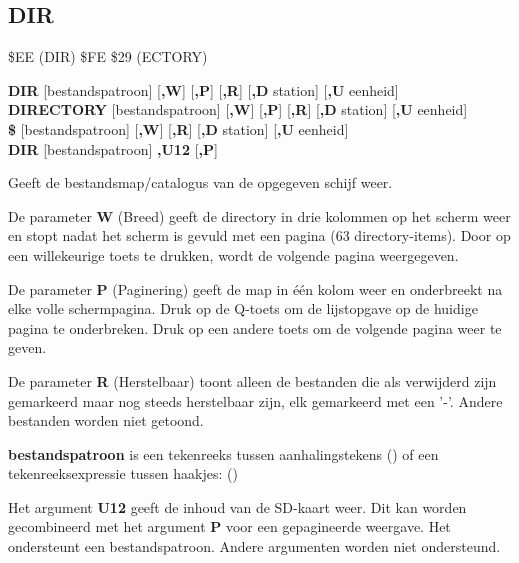 
\newpage
\subsection{DIR}
\begin{description}[leftmargin=2cm,style=nextline]
\item [Token:]    \$EE (DIR) \$FE \$29 (ECTORY)

\item [Formaat:]   {\bf DIR} [bestandspatroon] [{\bf,W}] [{\bf,P}] [{\bf,R}] [{\bf,D} station] [{\bf,U} eenheid] \\		            {\bf DIRECTORY} [bestandspatroon] [{\bf,W}] [{\bf,P}] [{\bf,R}] [{\bf,D} station] [{\bf,U} eenheid] \\		            {\bf \$} [bestandspatroon] [{\bf,W}] [{\bf,R}] [{\bf,D} station] [{\bf,U} eenheid] \\                  {\bf DIR} [bestandspatroon] {\bf,U12} [{\bf,P}]

\item [Gebruik:]    Geeft de bestandsmap/catalogus van de opgegeven schijf weer.

                  De parameter {\bf W} (Breed) geeft de directory in drie kolommen op het scherm weer en stopt nadat het scherm is gevuld met een pagina (63 directory-items). Door op een willekeurige toets te drukken, wordt de volgende pagina weergegeven.

De parameter {\bf P} (Paginering) geeft de map in één kolom weer en onderbreekt na elke volle schermpagina. Druk op de Q-toets om de lijstopgave op de huidige pagina te onderbreken. Druk op een andere toets om de volgende pagina weer te geven.

                  De parameter {\bf R} (Herstelbaar) toont alleen de bestanden die als verwijderd zijn gemarkeerd maar nog steeds herstelbaar zijn, elk gemarkeerd met een '-'. Andere bestanden worden niet getoond.

                  {\bf bestandspatroon} is een tekenreeks tussen aanhalingstekens () of een tekenreeksexpressie tussen haakjes: ()

                  Het argument {\bf U12} geeft de inhoud van de SD-kaart weer. Dit kan worden gecombineerd met het argument {\bf P} voor een gepagineerde weergave. Het ondersteunt een bestandspatroon. Andere argumenten worden niet ondersteund.

                  \drivedefinition


\end{description}
